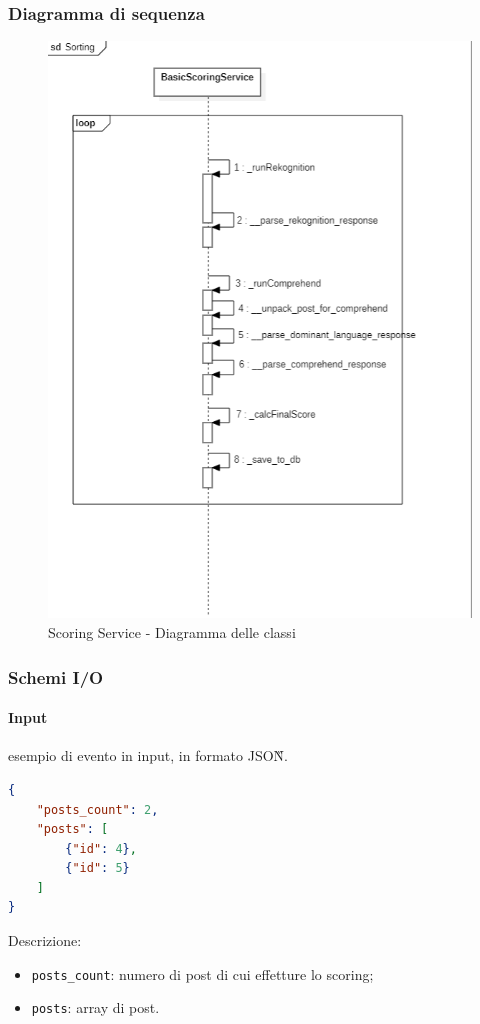 \subsubsection{Diagramma di sequenza}
\begin{figure}[!h]
    \includegraphics[width=15cm]{sezioni/images/sd_scoring.png}
    \caption{Scoring Service - Diagramma delle classi}
\end{figure}
\subsubsection{Schemi I/O}
\paragraph*{Input} esempio di evento in input, in formato JSON\G{}.
\begin{lstlisting}[language=JSON]
{
    "posts_count": 2,
    "posts": [
        {"id": 4},
        {"id": 5}
    ]
}
\end{lstlisting}
Descrizione:
\begin{itemize}
    \item \verb|posts_count|: numero di post di cui effetture lo scoring;
    \item \verb|posts|: array di post. 
\end{itemize}

